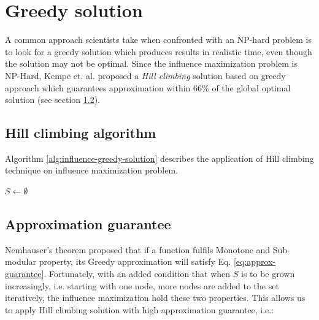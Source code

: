 	\section{Greedy solution}
	\label{sec:proof-greedy-solution}
	A common approach scientists take when confronted with an NP-hard problem is to look for a greedy solution which produces results in realistic time, even though the solution may not be optimal. Since the influence maximization problem is NP-Hard, Kempe et. al. \cite{kempe2003} proposed a \textit{Hill climbing} solution based on greedy approach which guarantees approximation within 66\% of the global optimal solution (see section \ref{subsec:related-work-approximation}).
	
		\subsection{Hill climbing algorithm}
		Algorithm \ref{alg:influence-greedy-solution} describes the application of Hill climbing technique on influence maximization problem.
		
		\begin{algorithm}[h]
			\caption{Greedy based Hill climbing solution for Influence Maximization}
			\label{alg:influence-greedy-solution}
			\SetAlgoLined
			$S \gets \emptyset$
			\newline
		\end{algorithm}

		\subsection{Approximation guarantee}
		\label{subsec:related-work-approximation}
		Nemhauser's \cite{nemhauser1978} theorem proposed that if a function fulfils Monotone and Sub-modular property, its Greedy approximation will satisfy Eq. \ref{eq:approx-guarantee}. Fortunately, with an added condition that when $S$ is to be grown increasingly, i.e. starting with one node, more nodes are added to the set iteratively, the influence maximization hold these two properties. This allows us to apply Hill climbing solution with high approximation guarantee, i.e.:
		
